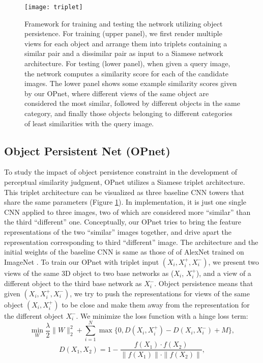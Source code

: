 \documentclass{article} %
\begin{document}
\begin{figure}[t]
\centering
\texttt{[image: triplet]}
\caption{Framework for training and testing the network utilizing object persistence. For training (upper panel), we first render multiple views for each object and arrange them into triplets containing a similar pair and a dissimilar pair as input to a Siamese network architecture. For testing (lower panel), when given a query image, the network computes a similarity score for each of the candidate images. The lower panel shows some example similarity scores given by our OPnet, where different views of the same object are considered the most similar, followed by different objects in the same category, and finally those objects belonging to different categories of least similarities with the query image.}
\label{fig:triplet}
\end{figure}

\subsection{Object Persistent Net (OPnet)}
To study the impact of object persistence constraint in the development of perceptual similarity judgment, OPnet utilizes a Siamese triplet architecture.  This triplet architecture can be visualized as three baseline CNN towers that share the same parameters (Figure \ref{fig:triplet}). In implementation, it is just one single CNN applied to three images, two of which are considered more ``similar'' than the third ``different'' one. Conceptually, our OPnet tries to bring the feature representations of the two ``similar'' images together, and drive apart the representation corresponding to third ``different'' image. The architecture and the initial weights of the baseline CNN is same as those of of AlexNet trained on ImageNet \citep{5206848}.
To train our OPnet with triplet input $(X_i, X_i^+, X_i^-)$, we present two views of the same 3D object to two base networks as ($X_i$, $X_i^+$), and a view of a different object to the third base network as $X_i^-$. Object persistence means that given $(X_i, X_i^+, X_i^-)$, we try to push the representations for views of the same object $(X_i, X_i^+)$ to be close and make them away from the representation for the different object $X_i^-$. We minimize the loss function with a hinge loss term:
\small $$ {\min_W} \frac{\lambda}{2}\parallel W \parallel_2^2 + \sum_{i=1}^N \max\{0, D(X_i, X_i^+)-D(X_i, X_i^-)+M\},$$
$$ D(X_1, X_2) = 1 - \frac{f(X_1) \cdot f(X_2)}{\parallel f(X_1) \parallel \cdot \parallel f(X_2) \parallel},$$
\normalsize
\end{document}
